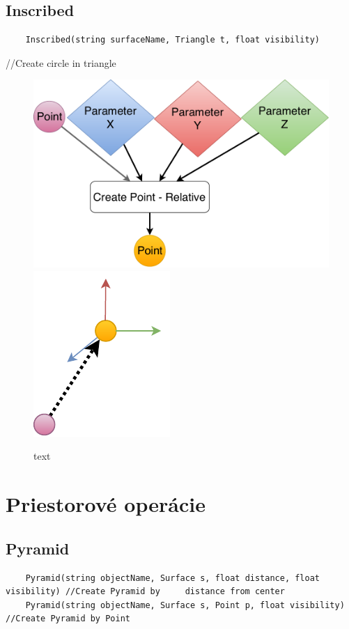 \subsection{Inscribed}
\begin{lstlisting}
	Inscribed(string surfaceName, Triangle t, float visibility)
\end{lstlisting}		//Create circle in triangle

\begin{figure}[H]
	\centering
	\includegraphics[height=0.3\textwidth]{obrazky-figures/Diagram/DP Navrh operacii-0D - Point2.pdf}
	\includegraphics[height=0.3\textwidth]{obrazky-figures/Diagram/Draw/1Points/DP Navrh operacii-0D - PointRelative.pdf}
	\caption{text}
	\label{fig:1}
\end{figure}







\section{Priestorové operácie}


\subsection{Pyramid}
\begin{lstlisting}
    Pyramid(string objectName, Surface s, float distance, float visibility) //Create Pyramid by     distance from center
    Pyramid(string objectName, Surface s, Point p, float visibility) //Create Pyramid by Point
\end{lstlisting}

